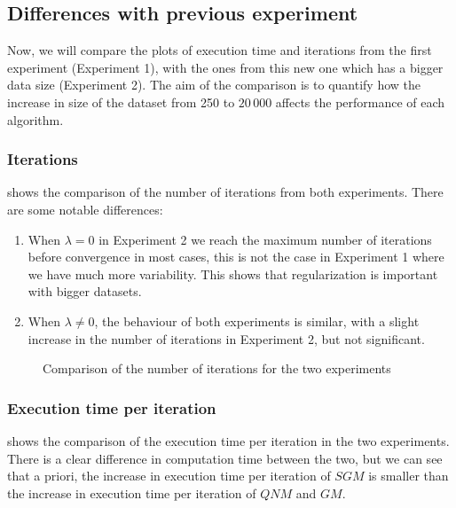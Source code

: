 \subsection{Differences with previous experiment}

Now, we will compare the plots of execution time and iterations
from the first experiment (Experiment 1), with
the ones from this new one which has a bigger data size (Experiment 2). The aim of the comparison
is to quantify how the increase in size of the dataset
from 250 to $20\,000$ affects the performance of each algorithm.

\subsubsection{Iterations}

 shows the comparison of the number
of iterations from both experiments. There are some notable differences:
\begin{enumerate}
    \item When $\lambda = 0$ in Experiment 2 we reach the maximum number of iterations
        before convergence in most cases, this is not the case in Experiment 1 where
        we have much more variability. This shows that regularization is important
        with bigger datasets.
    \item When $\lambda \neq 0$, the behaviour of both experiments is similar, with
        a slight increase in the number of iterations in Experiment 2, but not
        significant.
\end{enumerate}

\begin{figure}[H]
    
    \caption{Comparison of the number of iterations for the two experiments}
    \label{fig:comp_niter}
\end{figure}

\pagebreak
\subsubsection{Execution time per iteration}

 shows the comparison of the execution time per iteration in the
two experiments. There is a clear difference in computation time between the two, but
we can see that a priori, the increase in execution time per iteration of
$SGM$ is smaller than the increase in execution time per iteration of $QNM$ and $GM$.

